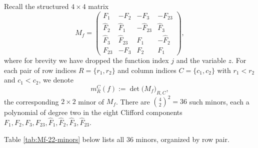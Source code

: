\documentclass[11pt]{amsart}
\begin{document}
Recall the structured $4\times 4$ matrix
\[
M_f =
\begin{pmatrix}
F_1 & -F_2 & -F_3 & -F_{23} \\
\hat F_2 & \hat F_1 & -\hat F_{23} & \hat F_3 \\
\hat F_3 & \hat F_{23} & \hat F_1 & -\hat F_2 \\
F_{23} & -F_3 & F_2 & F_1
\end{pmatrix},
\]
where for brevity we have dropped the function index $j$ and the variable $z$. For each pair of row indices $R = \{r_1, r_2\}$ and column indices $C = \{c_1, c_2\}$ with $r_1 < r_2$ and $c_1 < c_2$, we denote
\[
m_R^C(f) := \det\bigl(M_f\bigr)_{R, C},
\]
the corresponding $2\times 2$ minor of $M_f$. There are $\binom{4}{2}^2 = 36$ such minors, each a polynomial of degree two in the eight Clifford components $F_1, F_2, F_3, F_{23}, \hat F_1, \hat F_2, \hat F_3, \hat F_{23}$.

Table \ref{tab:Mf-22-minors} below lists all 36 minors, organized by row pair.
\end{document}
